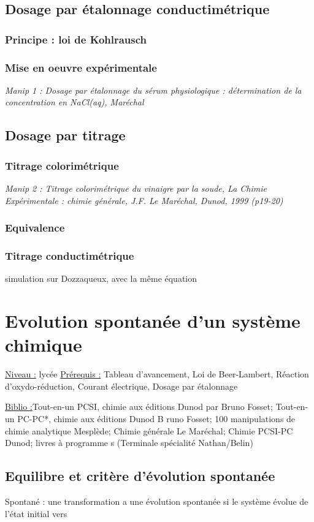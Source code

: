 \documentclass{article}%
\begin{document}
\subsection{Dosage par étalonnage conductimétrique}
\subsubsection{Principe : loi de Kohlrausch}
\subsubsection{Mise en oeuvre expérimentale}
\textit{Manip 1 : Dosage par étalonnage du sérum physiologique : détermination de la concentration en NaCl(aq), Maréchal}
\subsection{Dosage par titrage}
\subsubsection{Titrage colorimétrique}
\textit{Manip 2 : Titrage colorimétrique du vinaigre par la soude, La Chimie Expérimentale : chimie générale, J.F. Le Maréchal, Dunod, 1999 (p19-20)}
\subsubsection{Equivalence}
\subsubsection{Titrage conductimétrique}
simulation sur Dozzaqueux, avec la même équation
\section{Evolution spontanée d'un système chimique}
\underline{Niveau :} lycée
\underline{Prérequis :} Tableau d’avancement, Loi de Beer-Lambert, Réaction d’oxydo-réduction, Courant électrique, Dosage par étalonnage

\underline{Biblio :}Tout-en-un PCSI, chimie aux éditions Dunod par Bruno Fosset; Tout-en-un PC-PC*, chimie aux éditions Dunod B    runo Fosset; 100 manipulations de chimie analytique Mesplède; Chimie générale Le Maréchal; Chimie PCSI-PC Dunod; livres à programme
    s (Terminale spécialité Nathan/Belin)
 
\subsection{Equilibre et critère d'évolution spontanée}
Spontané : une transformation a une évolution spontanée si le système évolue de l’état initial vers
\end{document}
